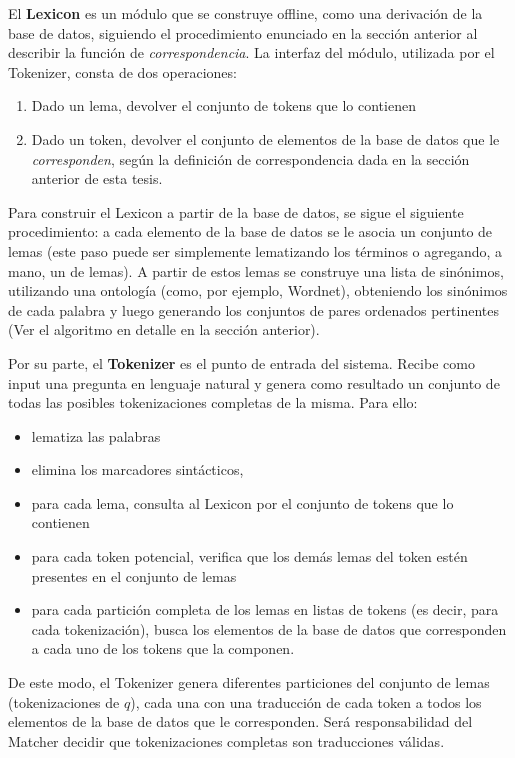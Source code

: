El \textbf{Lexicon} es un módulo que se construye offline, como una derivación de la base de datos, siguiendo el procedimiento enunciado en la sección anterior al describir la función de \textit{correspondencia}. La interfaz del módulo, utilizada por el Tokenizer, consta de dos operaciones:
\begin{enumerate}
  \item Dado un lema, devolver el conjunto de tokens que lo contienen
  \item Dado un token, devolver el conjunto de elementos de la base de datos que le \textit{corresponden}, según la definición de correspondencia dada en la sección anterior de esta tesis.
\end{enumerate}

Para construir el Lexicon a partir de la base de datos, se sigue el siguiente procedimiento: a cada elemento de la base de datos se le asocia un conjunto de lemas (este paso puede ser simplemente lematizando los términos o agregando, a mano, un  de lemas). A partir de estos lemas se construye una lista de sinónimos, utilizando una ontología (como, por ejemplo, Wordnet), obteniendo los sinónimos de cada palabra y luego generando los conjuntos de pares ordenados pertinentes (Ver el algoritmo en detalle en la sección anterior).

Por su parte, el \textbf{Tokenizer} es el punto de entrada del sistema. Recibe como input una pregunta en lenguaje natural y genera como resultado un conjunto de todas las posibles tokenizaciones completas de la misma. Para ello:
\begin{itemize}
  \item lematiza las palabras
  \item elimina los marcadores sintácticos,
  \item para cada lema, consulta al Lexicon por el conjunto de tokens que lo contienen
  \item para cada token potencial, verifica que los demás lemas del token estén presentes en el conjunto de lemas
  \item para cada partición completa de los lemas en listas de tokens (es decir, para cada tokenización), busca los elementos de la base de datos que corresponden a cada uno de los tokens que la componen.
\end{itemize}

De este modo, el Tokenizer genera diferentes particiones del conjunto de lemas (tokenizaciones de $q$), cada una con una traducción de cada token a todos los elementos de la base de datos que le corresponden. Será responsabilidad del Matcher decidir que tokenizaciones completas son traducciones válidas.

